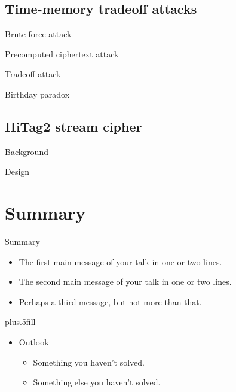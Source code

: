 \documentclass{beamer}
\begin{document}
\subsection{Time-memory tradeoff attacks}

\begin{frame}{Brute force attack}
\end{frame}

\begin{frame}{Precomputed ciphertext attack}
\end{frame}

\begin{frame}{Tradeoff attack}
\end{frame}

\begin{frame}{Birthday paradox}
\end{frame}

\subsection{HiTag2 stream cipher}

\begin{frame}{Background}
\end{frame}

\begin{frame}{Design}
\end{frame}


\section*{Summary}

\begin{frame}{Summary}

  \begin{itemize}
  \item
    The \alert{first main message} of your talk in one or two lines.
  \item
    The \alert{second main message} of your talk in one or two lines.
  \item
    Perhaps a \alert{third message}, but not more than that.
  \end{itemize}
  
  \vskip0pt plus.5fill
  \begin{itemize}
  \item
    Outlook
    \begin{itemize}
    \item
      Something you haven't solved.
    \item
      Something else you haven't solved.
    \end{itemize}
  \end{itemize}
\end{frame}
\end{document}
